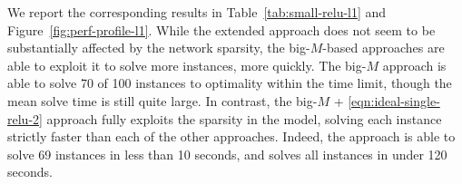 \documentclass[smallextended]{svjour3}
\newcommand{\blue}[1]{{#1}}
\begin{document}

We report the corresponding results in Table~\ref{tab:small-relu-l1} and Figure~\ref{fig:perf-profile-l1}. While the extended approach does not seem to be substantially affected by the network sparsity, the big-$M$-based approaches are able to exploit it to solve more instances, more quickly. The big-$M$ approach is able to solve 70 of 100 instances to optimality within the time limit, though the mean solve time is still quite large. In contrast, the big-$M$ + \eqref{eqn:ideal-single-relu-2} approach fully exploits the sparsity in the model, solving each instance strictly faster than each of the other approaches. Indeed, the approach is able to solve 69 instances in less than 10 seconds, and solves all instances in under 120 seconds.


\end{document}
